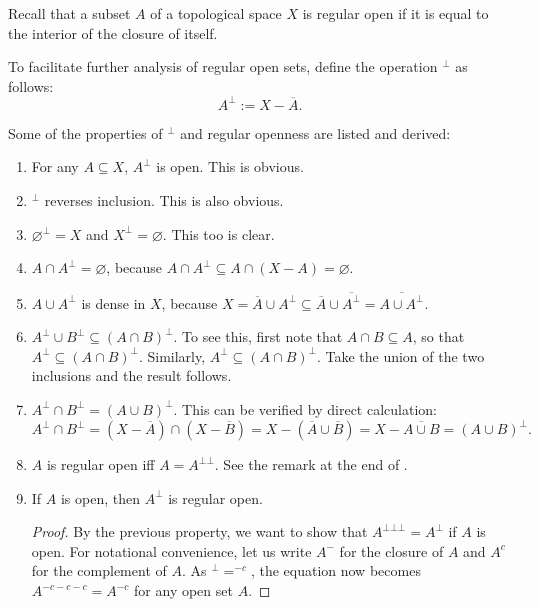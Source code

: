 \documentclass[12pt]{article}
\begin{document}
Recall that a subset $A$ of a topological space $X$ is regular open if it is equal to the interior of the closure of itself.

To facilitate further analysis of regular open sets, define the operation $^{\bot}$ as follows:
$$A^{\bot}:=X-\overline{A}.$$

Some of the properties of $^\bot$ and regular openness are listed and derived:
\begin{enumerate}
\item For any $A\subseteq X$, $A^{\bot}$ is open.  This is obvious.
\item $^\bot$ reverses inclusion.  This is also obvious.
\item $\varnothing^{\bot}=X$ and $X^{\bot}=\varnothing$.  This too is clear.
\item $A\cap A^{\bot}=\varnothing$, because $A\cap A^{\bot}\subseteq A\cap (X-A)=\varnothing$.
\item $A\cup A^{\bot}$ is dense in $X$, because $X=\overline{A}\cup A^{\bot} \subseteq \overline{A}\cup \overline{A^\bot} =\overline{A\cup A^\bot}$.
\item $A^{\bot}\cup B^{\bot}\subseteq(A\cap B)^{\bot}$.  To see this, first note that $A\cap B\subseteq A$, so that $A^\bot \subseteq (A\cap B)^\bot$.  Similarly, $A^\bot \subseteq (A\cap B)^\bot$.  Take the union of the two inclusions and the result follows.
\item $A^{\bot}\cap B^{\bot}=(A\cup B)^{\bot}$.  This can be verified by direct calculation: $$A^{\bot}\cap B^{\bot}= (X- \overline{A})\cap (X-\overline{B})=X-(\overline{A}\cup \overline{B})=X-\overline{A\cup B}=(A\cup B)^{\bot}.$$
\item $A$ is regular open iff $A=A^{\bot\bot}$.  See the remark at the end of .
\item If $A$ is open, then $A^{\bot}$ is regular open.
\begin{proof}
By the previous property, we want to show that $A^{\bot\bot\bot}=A^\bot$ if $A$ is open.  For notational convenience, let us write $A^-$ for the closure of $A$ and $A^c$ for the complement of $A$.  As $^\bot=^{-c}$, the equation now becomes $A^{-c-c-c}=A^{-c}$ for any open set $A$.


\end{proof}
\end{enumerate}
\end{document}
